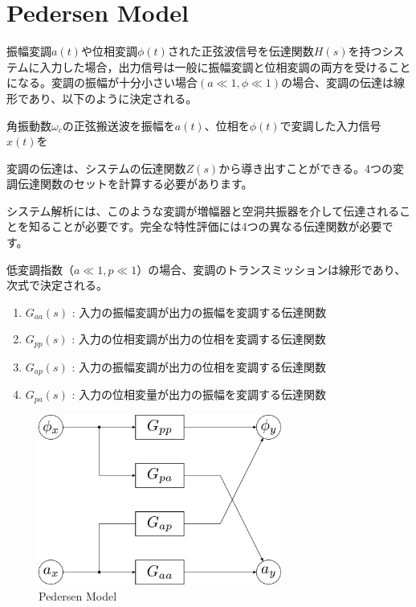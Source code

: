 \documentclass[book]{jlreq}
\begin{document}
\clearpage

\section{Pedersen Model \cite{Pedersen} \cite{Ninomiya}}


振幅変調$a(t)$や位相変調$\phi(t)$された正弦波信号を伝達関数$H(s)$を持つシステムに入力した場合，出力信号は一般に振幅変調と位相変調の両方を受けることになる。変調の振幅が十分小さい場合$(a \ll 1, \phi \ll 1)$の場合、変調の伝達は線形であり、以下のように決定される。

角振動数$\omega_c$の正弦搬送波を振幅を$a(t)$、位相を$\phi(t)$で変調した入力信号$x(t)$を


変調の伝達は、システムの伝達関数$Z(s)$から導き出すことができる。4つの変調伝達関数のセットを計算する必要があります。

システム解析には、このような変調が増幅器と空洞共振器を介して伝達されることを知ることが必要です。完全な特性評価には4つの異なる伝達関数が必要です。

低変調指数（$a \ll 1, p \ll 1$）の場合、変調のトランスミッションは線形であり、次式で決定される。
%
\begin{enumerate}
    \item $G_{aa}(s)$ : 入力の振幅変調が出力の振幅を変調する伝達関数
    \item $G_{pp}(s)$ : 入力の位相変調が出力の位相を変調する伝達関数
    \item $G_{ap}(s)$ : 入力の振幅変調が出力の位相を変調する伝達関数
    \item $G_{pa}(s)$ : 入力の位相変量が出力の振幅を変調する伝達関数
\end{enumerate}
%
\begin{figure}[hbt]
    \begin{center}
        \includegraphics[width=8cm,clip]{figs/Pedersen_Model.pdf}
        \caption{Pedersen Model}
        \label{fig:PM}
    \end{center}
\end{figure}
%
\end{document}
